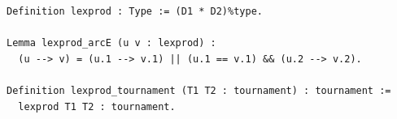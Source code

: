 \begin{lstlisting}[language=Rocq]
Definition lexprod : Type := (D1 * D2)%type.

Lemma lexprod_arcE (u v : lexprod) :
  (u --> v) = (u.1 --> v.1) || (u.1 == v.1) && (u.2 --> v.2).

Definition lexprod_tournament (T1 T2 : tournament) : tournament :=
  lexprod T1 T2 : tournament.
\end{lstlisting}
